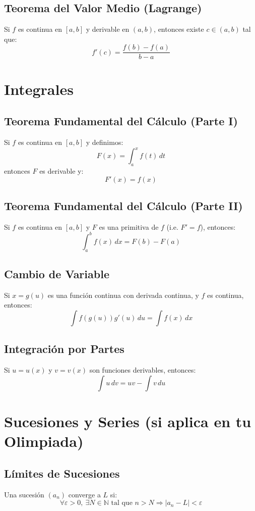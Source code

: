 \documentclass[12pt]{article}
\begin{document}
\subsection{Teorema del Valor Medio (Lagrange)}
Si $f$ es continua en $[a,b]$ y derivable en $(a,b)$, entonces existe $c \in (a,b)$ tal que:
\[
f'(c) = \frac{f(b) - f(a)}{b - a}
\]

\section{Integrales}

\subsection{Teorema Fundamental del Cálculo (Parte I)}
Si $f$ es continua en $[a,b]$ y definimos:
\[
F(x) = \int_a^x f(t)\,dt
\]
entonces $F$ es derivable y:
\[
F'(x) = f(x)
\]

\subsection{Teorema Fundamental del Cálculo (Parte II)}
Si $f$ es continua en $[a,b]$ y $F$ es una primitiva de $f$ (i.e. $F' = f$), entonces:
\[
\int_a^b f(x)\,dx = F(b) - F(a)
\]

\subsection{Cambio de Variable}
Si $x = g(u)$ es una función continua con derivada continua, y $f$ es continua, entonces:
\[
\int f(g(u))g'(u)\,du = \int f(x)\,dx
\]

\subsection{Integración por Partes}
Si $u=u(x)$ y $v=v(x)$ son funciones derivables, entonces:
\[
\int u\,dv = uv - \int v\,du
\]

\section{Sucesiones y Series (si aplica en tu Olimpiada)}

\subsection{Límites de Sucesiones}
Una sucesión $(a_n)$ converge a $L$ si:
\[
\forall \varepsilon > 0,\ \exists N \in \mathbb{N} \text{ tal que } n > N \Rightarrow |a_n - L| < \varepsilon
\]
\end{document}

